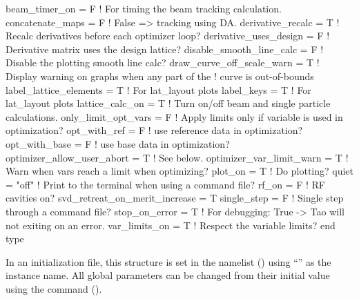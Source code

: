 {{{{{{{{\begin{example}
  beam_timer_on = F                ! For timing the beam tracking calculation.
  concatenate_maps = F             ! False => tracking using DA.
  derivative_recalc = T            ! Recalc derivatives before each optimizer loop?
  derivative_uses_design = F       ! Derivative matrix uses the design lattice?
  disable_smooth_line_calc = F     ! Disable the plotting smooth line calc?
  draw_curve_off_scale_warn = T    ! Display warning on graphs when any part of the 
                                   !   curve is out-of-bounds
  label_lattice_elements = T       ! For lat_layout plots
  label_keys = T                   ! For lat_layout plots
  lattice_calc_on = T              ! Turn on/off beam and single particle calculations.
  only_limit_opt_vars = F          ! Apply limits only if variable is used in optimization?
  opt_with_ref = F                 ! use reference data in optimization?
  opt_with_base = F                ! use base data in optimization?
  optimizer_allow_user_abort = T   ! See below.
  optimizer_var_limit_warn = T     ! Warn when vars reach a limit when optimizing?
  plot_on = T                      ! Do plotting?
  quiet = "off"                    ! Print to the terminal when using a command file?
  rf_on = F                        ! RF cavities on?
  svd_retreat_on_merit_increase = T    
  single_step = F                  ! Single step through a command file?
  stop_on_error = T                ! For debugging: True -> Tao will not exiting on an error.
  var_limits_on = T                ! Respect the variable limits?
end type
\end{example}

In an initialization file, this structure is set in the  namelist ()
using ``'' as the instance name. All global parameters can be changed from their initial
value using the  command ().

  \begin{description}
  \item{\vn{global%
When constructing transfer Taylor maps the default method, used with \vn{global%
False, is to use Differential Algebra (DA) to integrate the map from the starting point to the
ending point.  Alternatively, with \vn{global%
integration region has an associated map, that map is concatenated with the map under construction.
This saves time but the potential drawback is a loss of accuracy. Note that a lattice element
will only have an associate map if the \vn{tracking_method} or \vn{make_mat6_method} components
of the lattice element are such that a map is needed for tracking (see the \bmad manual for more
details).

}}}}
\end{description}}}}}}}}}

